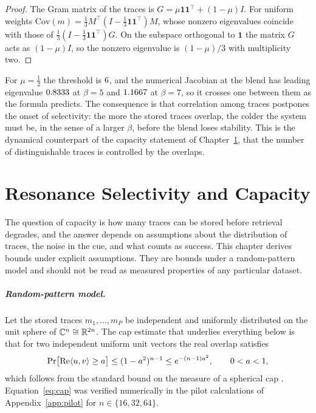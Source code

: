 \begin{proof}
The Gram matrix of the traces is $G=\mu\mathbf 1\mathbf 1^{\top}+(1-\mu)I$. For uniform weights $\mathrm{Cov}(m)=\tfrac13M^{\top}(I-\tfrac13\mathbf 1\mathbf 1^{\top})M$, whose nonzero eigenvalues coincide with those of $\tfrac13(I-\tfrac13\mathbf 1\mathbf 1^{\top})G$. On the subspace orthogonal to $\mathbf 1$ the matrix $G$ acts as $(1-\mu)I$, so the nonzero eigenvalue is $(1-\mu)/3$ with multiplicity two.
\end{proof}

For $\mu=\tfrac12$ the threshold is $6$, and the numerical Jacobian at the blend has leading eigenvalue $0.8333$ at $\beta=5$ and $1.1667$ at $\beta=7$, so it crosses one between them as the formula predicts. The consequence is that correlation among traces postpones the onset of selectivity: the more the stored traces overlap, the colder the system must be, in the sense of a larger $\beta$, before the blend loses stability. This is the dynamical counterpart of the capacity statement of Chapter~\ref{ch:capacity}, that the number of distinguishable traces is controlled by the overlaps.


\chapter{Resonance Selectivity and Capacity}\label{ch:capacity}

The question of capacity is how many traces can be stored before retrieval degrades, and the answer depends on assumptions about the distribution of traces, the noise in the cue, and what counts as success. This chapter derives bounds under explicit assumptions. They are bounds under a random-pattern model and should not be read as measured properties of any particular dataset.

\paragraph{Random-pattern model.} Let the stored traces $m_1,\dots,m_P$ be independent and uniformly distributed on the unit sphere of $\mathbb{C}^n\cong\mathbb{R}^{2n}$. The cap estimate that underlies everything below is that for two independent uniform unit vectors the real overlap satisfies
\begin{equation}\label{eq:cap}
\Pr\bigl[\operatorname{Re}\langle u,v\rangle\ge a\bigr]\le(1-a^2)^{n-1}\le e^{-(n-1)a^2},\qquad 0<a<1,
\end{equation}
which follows from the standard bound on the measure of a spherical cap \cite{ball1997}. Equation~\eqref{eq:cap} was verified numerically in the pilot calculations of Appendix~\ref{app:pilot} for $n\in\{16,32,64\}$.

